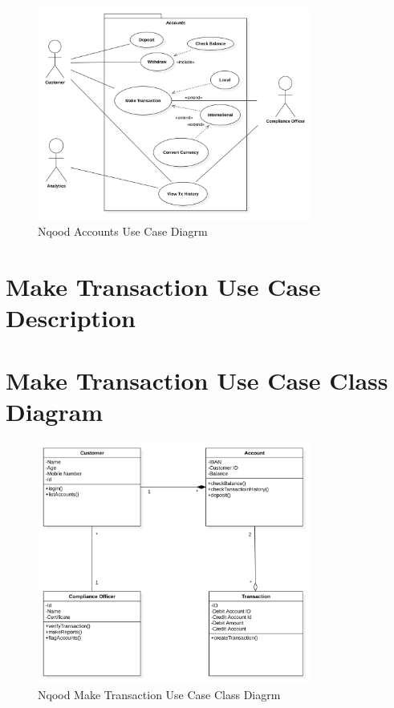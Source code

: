 \documentclass[a4paper]{report}
\begin{document}
\begin{figure}[h!]
    \centering
    \includegraphics[width=0.8\textwidth]{images/nqood-accounts-use-case-diagram.png}
    \caption{Nqood Accounts Use Case Diagrm}
    \label{fig:nqood-accounts-use-case-diagram}
\end{figure}

\section{Make Transaction Use Case Description}

\section{Make Transaction Use Case Class Diagram}

\begin{figure}[h!]
    \centering
    \includegraphics[width=0.8\textwidth]{images/nqood-make-tx-use-case-class-diagram.png}
    \caption{Nqood Make Transaction Use Case Class Diagrm}
    \label{fig:nqood-make-transaction-use-case-class-diagram}
\end{figure}
\end{document}
